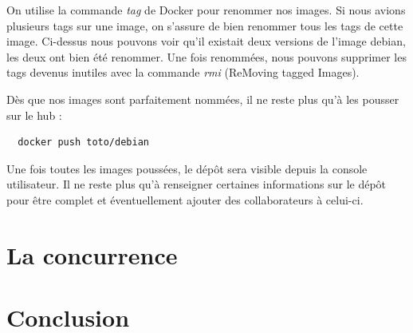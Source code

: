 \documentclass[12pt,a4paper]{article}
\begin{document}
On utilise la commande \textit{tag} de Docker pour renommer nos images. Si nous avions plusieurs tags sur une image, on s'assure de bien renommer tous les tags de cette image. Ci-dessus nous pouvons voir qu'il existait deux versions de l'image debian, les deux ont bien été renommer. Une fois renommées, nous pouvons supprimer les tags devenus inutiles avec la commande \textit{rmi} (ReMoving tagged Images).

Dès que nos images sont parfaitement nommées, il ne reste plus qu'à les pousser sur le hub :

\begin{lstlisting}
  docker push toto/debian
\end{lstlisting}

Une fois toutes les images poussées, le dépôt sera visible depuis la console utilisateur. Il ne reste plus qu'à renseigner certaines informations sur le dépôt pour être complet et éventuellement ajouter des collaborateurs à celui-ci. 

\section{La concurrence}

\section{Conclusion}
\end{document}
